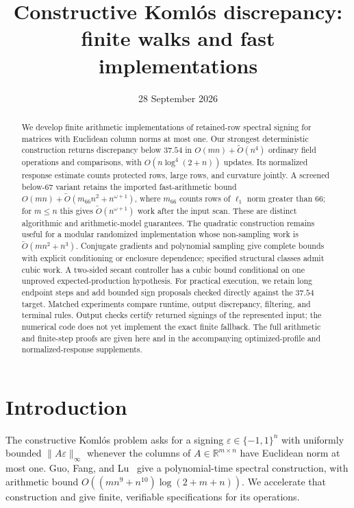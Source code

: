 \documentclass[11pt]{amsart}
\title[Constructive Koml\'os discrepancy]{Constructive Koml\'os discrepancy:\\finite walks and fast implementations}
\author{}
\date{28 September 2026}
\theoremstyle{definition}\newtheorem{definition}[theorem]{Definition}
\theoremstyle{remark}\newtheorem{remark}[theorem]{Remark}
\numberwithin{equation}{section}
\begin{document}
\begin{abstract}
We develop finite arithmetic implementations of retained-row spectral
signing for matrices with Euclidean column norms at most one. Our
strongest deterministic construction returns discrepancy below $37.54$
in $O(mn)+\widetilde O(n^4)$ ordinary field operations and comparisons,
with $O(n\log^4(2+n))$ updates. Its normalized response estimate counts
protected rows, large rows, and curvature jointly. A screened below-$67$
variant retains the imported fast-arithmetic bound
$O(mn)+\widetilde O(m_{66}n^2+n^{\omega+1})$, where $m_{66}$ counts
rows of $\ell_1$ norm greater than 66; for $m\le n$ this gives
$\widetilde O(n^{\omega+1})$ work after the input scan.
These are distinct algorithmic and arithmetic-model guarantees.
The quadratic construction remains useful for a modular randomized
implementation whose non-sampling work is $\widetilde O(mn^2+n^3)$.
Conjugate gradients and polynomial sampling give complete bounds with
explicit conditioning or enclosure dependence; specified structural
classes admit cubic work. A two-sided secant controller has a cubic
bound conditional on one unproved expected-production hypothesis.
For practical execution, we retain long endpoint steps and add bounded
sign proposals checked directly against the $37.54$ target. Matched
experiments compare runtime, output discrepancy, filtering, and terminal
rules. Output checks certify returned signings of the represented input;
the numerical code does not yet implement the exact finite fallback.
The full arithmetic and finite-step proofs are given here and in the
accompanying optimized-profile and normalized-response supplements.
\end{abstract}
\maketitle
\tableofcontents
\clearpage

\section{Introduction}
The constructive Koml\'os problem asks for a signing
$\varepsilon\in\{-1,1\}^n$ with uniformly bounded $\|A\varepsilon\|_\infty$
whenever the columns of $A\in\mathbb R^{m\times n}$ have Euclidean norm
at most one. Guo, Fang, and Lu~\cite{GFL} give a polynomial-time spectral
construction, with arithmetic bound
$O((mn^9+n^{10})\log(2+m+n))$.
We accelerate that construction and give finite, verifiable
specifications for its operations.
\end{document}
